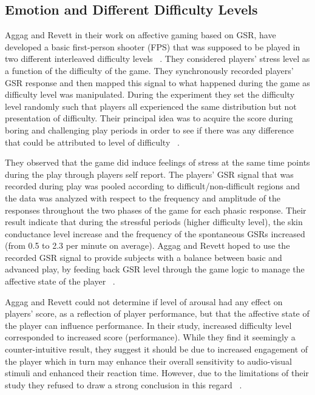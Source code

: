\subsection{Emotion and Different Difficulty Levels}
Aggag and Revett in their work on affective gaming based on GSR, have developed a basic first-person shooter (FPS) that was supposed to be played in two different interleaved difficulty levels ~\cite{aggag2011affective}. They considered players' stress level as a function of the difficulty of the game. They synchronously recorded players' GSR response and then mapped this signal to what happened during the game as difficulty level was manipulated. During the experiment they set the difficulty level randomly such that players all experienced the same distribution but not presentation of difficulty. Their principal idea was to acquire the score during boring and challenging play periods in order to see if there was any difference that could be attributed to level of difficulty ~\cite{aggag2011affective}.

They observed that the game did induce feelings of stress at the same time points during the play through players self report. The players' GSR signal that was recorded during play was pooled according to difficult/non-difficult regions and the data was analyzed with respect to the frequency and amplitude of the responses throughout the two phases of the game for each phasic response. Their result indicate that during the stressful periods (higher difficulty level), the skin conductance level increase and the frequency of the spontaneous GSRs increased (from 0.5 to 2.3 per minute on average). Aggag and Revett hoped to use the recorded GSR signal to provide subjects with a balance between basic and advanced play, by feeding back GSR level through the game logic to manage the affective state of the player ~\cite{aggag2011affective}.

Aggag and Revett could not determine if level of arousal had any effect on players' score, as a reflection of player performance, but that the affective state of the player can influence performance. In their study, increased difficulty level corresponded to increased score (performance). While they find it seemingly a counter-intuitive result, they suggest it should be due to increased engagement of the player which in turn may enhance their overall sensitivity to audio-visual stimuli and enhanced their reaction time. However, due to the limitations of their study they refused to draw a strong conclusion in this regard ~\cite{aggag2011affective}.

